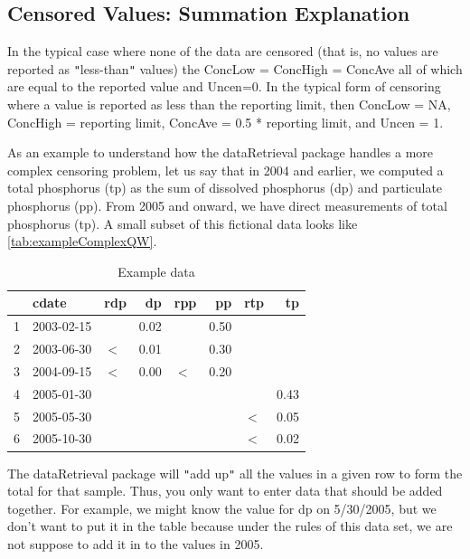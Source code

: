\documentclass[a4paper,11pt]{article}\usepackage[]{graphicx}\usepackage[]{color}
\begin{document}
\subsection{Censored Values: Summation Explanation}
In the typical case where none of the data are censored (that is, no values are reported as \texttt{"}less-than\texttt{"} values) the ConcLow = ConcHigh = ConcAve all of which are equal to the reported value and Uncen=0.  In the typical form of censoring where a value is reported as less than the reporting limit, then ConcLow = NA, ConcHigh = reporting limit, ConcAve = 0.5 * reporting limit, and Uncen = 1.

As an example to understand how the dataRetrieval package handles a more complex censoring problem, let us say that in 2004 and earlier, we computed a total phosphorus (tp) as the sum of dissolved phosphorus (dp) and particulate phosphorus (pp). From 2005 and onward, we have direct measurements of total phosphorus (tp). A small subset of this fictional data looks like \ref{tab:exampleComplexQW}.



\begin{table}[ht]
\centering
\begin{tabular}{rllrlrlr}
  \hline
 & cdate & rdp & dp & rpp & pp & rtp & tp \\ 
  \hline
1 & 2003-02-15 &  & 0.02 &  & 0.50 &  &  \\ 
  2 & 2003-06-30 & $<$ & 0.01 &  & 0.30 &  &  \\ 
  3 & 2004-09-15 & $<$ & 0.00 & $<$ & 0.20 &  &  \\ 
  4 & 2005-01-30 &  &  &  &  &  & 0.43 \\ 
  5 & 2005-05-30 &  &  &  &  & $<$ & 0.05 \\ 
  6 & 2005-10-30 &  &  &  &  & $<$ & 0.02 \\ 
   \hline
\end{tabular}
\caption{Example data} 
\end{table}






The dataRetrieval package will \texttt{"}add up\texttt{"} all the values in a given row to form the total for that sample. Thus, you only want to enter data that should be added together. For example, we might know the value for dp on 5/30/2005, but we don't want to put it in the table because under the rules of this data set, we are not suppose to add it in to the values in 2005.
\end{document}
